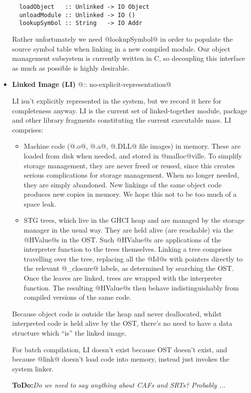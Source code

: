 \documentclass[11pt]{article}
\newcommand{\ToDo}[1]{{{\bf ToDo:}\sl #1}}
\begin{document}
\begin{itemize}
  \begin{verbatim}
  loadObject   :: Unlinked -> IO Object
  unloadModule :: Unlinked -> IO ()
  lookupSymbol :: String   -> IO Addr
  \end{verbatim}

  Rather unfortunately we need @lookupSymbol@ in order to populate the
  source symbol table when linking in a new compiled module.  Our
  object management subsystem is currently written in C, so decoupling
  this interface as much as possible is highly desirable.

\item
   {\bf Linked Image (LI)} @:: no-explicit-representation@

   LI isn't explicitly represented in the system, but we record it
   here for completeness anyway.  LI is the current set of
   linked-together module, package and other library fragments
   constituting the current executable mass.  LI comprises:
   \begin{itemize}
   \item Machine code (@.o@, @.a@, @.DLL@ file images) in memory.
         These are loaded from disk when needed, and stored in
         @malloc@ville.  To simplify storage management, they are
         never freed or reused, since this creates serious
         complications for storage management.  When no longer needed,
         they are simply abandoned.  New linkings of the same object
         code produces new copies in memory.  We hope this not to be
         too much of a space leak.
   \item STG trees, which live in the GHCI heap and are managed by the
         storage manager in the usual way.  They are held alive (are 
         reachable) via the @HValue@s in the OST.  Such @HValue@s are
         applications of the interpreter function to the trees
         themselves.  Linking a tree comprises travelling over the 
         tree, replacing all the @Id@s with pointers directly to the
         relevant @_closure@ labels, as determined by searching the
         OST.  Once the leaves are linked, trees are wrapped with the
         interpreter function.  The resulting @HValue@s then behave
         indistinguishably from compiled versions of the same code.
   \end{itemize}
   Because object code is outside the heap and never deallocated,
   whilst interpreted code is held alive by the OST, there's no need
   to have a data structure which ``is'' the linked image.

   For batch compilation, LI doesn't exist because OST doesn't exist,
   and because @link@ doesn't load code into memory, instead just
   invokes the system linker.

   \ToDo{Do we need to say anything about CAFs and SRTs?  Probably ...}
\end{itemize}
\end{document}
